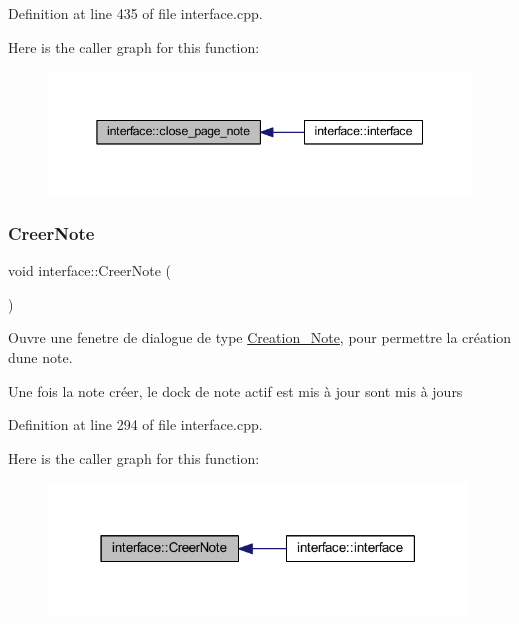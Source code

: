 Definition at line 435 of file interface.\+cpp.

Here is the caller graph for this function\+:\nopagebreak
\begin{figure}[H]
\begin{center}
\leavevmode
\includegraphics[width=345pt]{classinterface_abe2464522932a5d8ed76d1ba02c9d2c6_icgraph}
\end{center}
\end{figure}
\mbox{\label{classinterface_a23957135caad59d8850fe8e2cbee28a3}} 
\subsubsection{\texorpdfstring{Creer\+Note}{CreerNote}}
{\footnotesize\ttfamily void interface\+::\+Creer\+Note (\begin{DoxyParamCaption}{ }\end{DoxyParamCaption})\hspace{0.3cm}{\ttfamily [slot]}}



Ouvre une fenetre de dialogue de type \hyperlink{class_creation___note}{Creation\+\_\+\+Note}, pour permettre la création d\textquotesingle{}une note. 

Une fois la note créer, le dock de note actif est mis à jour sont mis à jours 

Definition at line 294 of file interface.\+cpp.

Here is the caller graph for this function\+:\nopagebreak
\begin{figure}[H]
\begin{center}
\leavevmode
\includegraphics[width=315pt]{classinterface_a23957135caad59d8850fe8e2cbee28a3_icgraph}
\end{center}
\end{figure}
\mbox{\label{classinterface_a319f133949e2be97a203f725c3f1e565}} 
